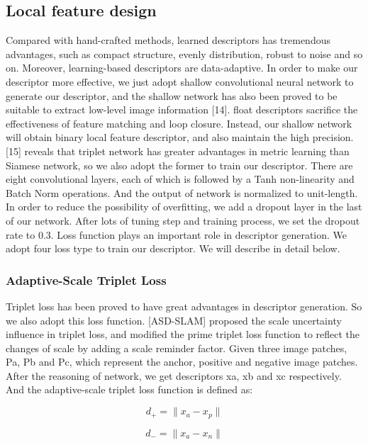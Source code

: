 \documentclass{svproc}
\begin{document}
\subsection{Local feature design } 
Compared with hand-crafted methods, learned descriptors has tremendous advantages, such as compact structure, evenly distribution, robust to noise and so on. Moreover, learning-based descriptors are data-adaptive. In order to make our descriptor more effective, we just adopt shallow convolutional neural network to generate our descriptor, and the shallow network has also been proved to be suitable to extract low-level image information [14]. float descriptors sacrifice the effectiveness of feature matching and loop closure. Instead, our shallow network will obtain binary local feature descriptor, and also maintain the high precision.
	[15] reveals that triplet network has greater advantages in metric learning than Siamese network, so we also adopt the former to train our descriptor. There are eight convolutional layers, each of which is followed by a Tanh non-linearity and Batch Norm operations. And the output of network is normalized to unit-length. In order to reduce the possibility of overfitting, we add a dropout layer in the last of our network. After lots of tuning step and training process, we set the dropout rate to 0.3.
	Loss function plays an important role in descriptor generation. We adopt four loss type to train our descriptor. We will describe in detail below.

\subsubsection{Adaptive-Scale Triplet Loss} 
Triplet loss has been proved to have great advantages in descriptor generation. So we also adopt this loss function. [ASD-SLAM] proposed the scale uncertainty influence in triplet loss, and modified the prime triplet loss function to reflect the changes of scale by adding a scale reminder factor. Given three image patches, Pa, Pb and Pc, which represent the anchor, positive and negative image patches. After the reasoning of network, we get descriptors xa, xb and xc respectively. And the adaptive-scale triplet loss function is defined as:

\begin{equation}
d _{+} = \| x_{a} - x_{p}  \| 
\end{equation}

\begin{equation}
d _{-} = \| x_{a} - x_{n}  \| 
\end{equation}
\end{document}
